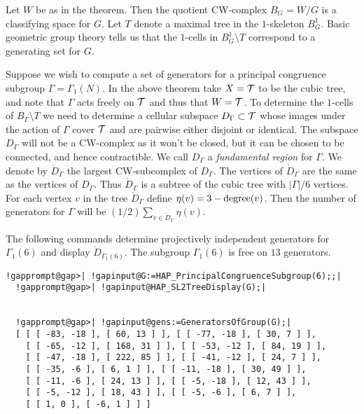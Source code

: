 \documentclass[a4paper,11pt]{report}
\begin{document}
{{ 

Let $W$ be as in the theorem. Then the quotient CW-complex $B_G=W/G$ is a classifying space for $G$. Let $T$ denote a maximal tree in the $1$-skeleton $B^1_G$. Basic geometric group theory tells us that the $1$-cells in $B^1_G\setminus T$ correspond to a generating set for $G$. 

 Suppose we wish to compute a set of generators for a principal congruence
subgroup $\Gamma=\Gamma_1(N)$. In the above theorem take $X={\cal T}$ to be the cubic tree, and note that $\Gamma$ acts freely on $\cal T$ and thus that $W={\cal T}$. To determine the $1$-cells of $B_{\Gamma}\setminus T$ we need to determine a cellular subspace $D_\Gamma \subset \cal T$ whose images under the action of $\Gamma$ cover $\cal T$ and are pairwise either disjoint or identical. The subspace $D_\Gamma$ will not be a CW-complex as it won't be closed, but it can be chosen to be
connected, and hence contractible. We call $D_\Gamma$ a \emph{fundamental region} for $\Gamma$. We denote by $\mathring D_\Gamma$ the largest CW-subcomplex of $D_\Gamma$. The vertices of $\mathring D_\Gamma$ are the same as the vertices of $D_\Gamma$. Thus $\mathring D_\Gamma$ is a subtree of the cubic tree with $|\Gamma|/6$ vertices. For each vertex $v$ in the tree $\mathring D_\Gamma$ define $\eta(v)=3 -{\rm degree}(v)$. Then the number of generators for $ \Gamma $ will be $(1/2)\sum_{v\in \mathring D_\Gamma} \eta(v)$. 

 The following commands determine projectively independent generators for $\Gamma_1(6)$ and display $\mathring D_{\Gamma_1(6)}$. The subgroup $\Gamma_1(6)$ is free on $13$ generators. 
\begin{Verbatim}[commandchars=!@|,fontsize=\small,frame=single,label=Example]
  !gapprompt@gap>| !gapinput@G:=HAP_PrincipalCongruenceSubgroup(6);;|
  !gapprompt@gap>| !gapinput@HAP_SL2TreeDisplay(G);|
  
  
  !gapprompt@gap>| !gapinput@gens:=GeneratorsOfGroup(G);|
  [ [ [ -83, -18 ], [ 60, 13 ] ], [ [ -77, -18 ], [ 30, 7 ] ], 
    [ [ -65, -12 ], [ 168, 31 ] ], [ [ -53, -12 ], [ 84, 19 ] ], 
    [ [ -47, -18 ], [ 222, 85 ] ], [ [ -41, -12 ], [ 24, 7 ] ], 
    [ [ -35, -6 ], [ 6, 1 ] ], [ [ -11, -18 ], [ 30, 49 ] ], 
    [ [ -11, -6 ], [ 24, 13 ] ], [ [ -5, -18 ], [ 12, 43 ] ], 
    [ [ -5, -12 ], [ 18, 43 ] ], [ [ -5, -6 ], [ 6, 7 ] ], 
    [ [ 1, 0 ], [ -6, 1 ] ] ]
  
\end{Verbatim}
 

}}
\end{document}
